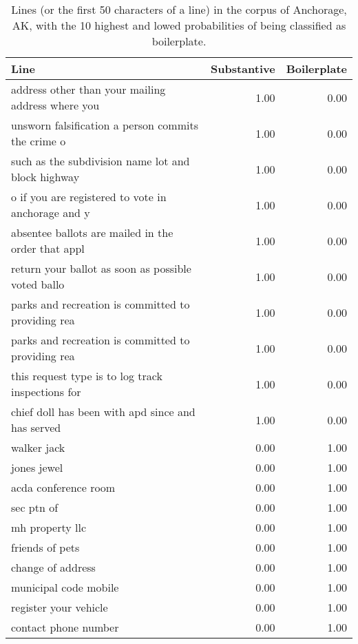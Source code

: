 \begin{table}[ht]
\centering
\begingroup\small
\begin{tabular}{lrr}
  \hline
Line & Substantive & Boilerplate \\ 
  \hline
address other than your mailing address where you  & 1.00 & 0.00 \\ 
  unsworn falsification a person commits the crime o & 1.00 & 0.00 \\ 
  such as the subdivision name lot and block highway & 1.00 & 0.00 \\ 
  o if you are registered to vote in anchorage and y & 1.00 & 0.00 \\ 
  absentee ballots are mailed in the order that appl & 1.00 & 0.00 \\ 
  return your ballot as soon as possible voted ballo & 1.00 & 0.00 \\ 
  parks and recreation is committed to providing rea & 1.00 & 0.00 \\ 
  parks and recreation is committed to providing rea & 1.00 & 0.00 \\ 
  this request type is to log track inspections for  & 1.00 & 0.00 \\ 
  chief doll has been with apd since and has served  & 1.00 & 0.00 \\ 
  walker jack & 0.00 & 1.00 \\ 
  jones jewel & 0.00 & 1.00 \\ 
  acda conference room & 0.00 & 1.00 \\ 
  sec ptn of & 0.00 & 1.00 \\ 
  mh property llc & 0.00 & 1.00 \\ 
  friends of pets & 0.00 & 1.00 \\ 
  change of address & 0.00 & 1.00 \\ 
  municipal code mobile & 0.00 & 1.00 \\ 
  register your vehicle & 0.00 & 1.00 \\ 
  contact phone number & 0.00 & 1.00 \\ 
   \hline
\end{tabular}
\endgroup
\caption{Lines (or the first 50 characters of a line) in the corpus of Anchorage, AK, with the 10 highest and lowed probabilities of being classified as boilerplate.} 
\end{table}

